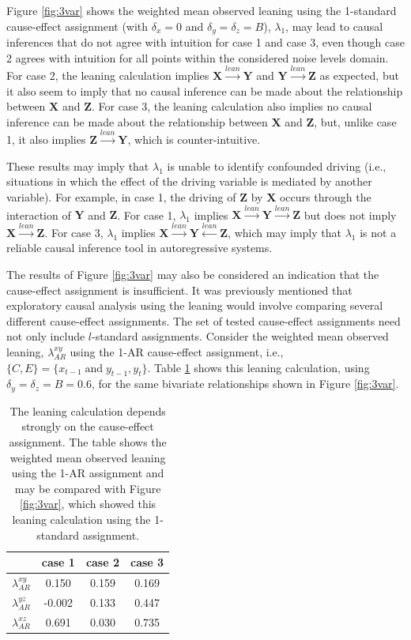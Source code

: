 \documentclass[twocolumn,aps,pre,groupedaddress]{revtex4-1}
\begin{document}
Figure \ref{fig:3var} shows the weighted mean observed leaning using the 1-standard cause-effect assignment (with $\delta_x = 0$ and $\delta_y = \delta_z = B$), $\lambda_1$, may lead to causal inferences that do not agree with intuition for case 1 and case 3, even though case 2 agrees with intuition for all points within the considered noise levels domain.  For case 2, the leaning calculation implies $\mathbf{X}\xrightarrow{lean}\mathbf{Y}$ and $\mathbf{Y}\xrightarrow{lean}\mathbf{Z}$ as expected, but it also seem to imply that no causal inference can be made about the relationship between $\mathbf{X}$ and $\mathbf{Z}$.  For case 3, the leaning calculation also implies no causal inference can be made about the relationship between $\mathbf{X}$ and $\mathbf{Z}$, but, unlike case 1, it also implies $\mathbf{Z}\xrightarrow{lean}\mathbf{Y}$, which is counter-intuitive.

These results may imply that $\lambda_1$ is unable to identify confounded driving (i.e., situations in which the effect of the driving variable is mediated by another variable).  For example, in case 1, the driving of $\mathbf{Z}$ by $\mathbf{X}$ occurs through the interaction of $\mathbf{Y}$ and $\mathbf{Z}$.  For case 1, $\lambda_1$ implies $\mathbf{X}\xrightarrow{lean}\mathbf{Y}\xrightarrow{lean}\mathbf{Z}$ but does not imply $\mathbf{X}\xrightarrow{lean}\mathbf{Z}$.  For case 3, $\lambda_1$ implies $\mathbf{X}\xrightarrow{lean}\mathbf{Y}\xleftarrow{lean}\mathbf{Z}$, which may imply that $\lambda_1$ is not a reliable causal inference tool in autoregressive systems.

The results of Figure \ref{fig:3var} may also be considered an indication that the cause-effect assignment is insufficient.  It was previously mentioned that exploratory causal analysis using the leaning would involve comparing several different cause-effect assignments.  The set of tested cause-effect assignments need not only include $l$-standard assignments.  Consider the weighted mean observed leaning, $\lambda_{AR}^{xy}$ using the 1-AR cause-effect assignment, i.e., $\{C,E\} = \{x_{t-1}\;\mathrm{ and }\;y_{t-1},y_t\}$.  Table \ref{tab:3var} shows this leaning calculation, using $\delta_y=\delta_z=B=0.6$, for the same bivariate relationships shown in Figure \ref{fig:3var}.
\begin{table}
\begin{tabular}{lccc}
 & case 1 & case 2 & case 3\\
 \hline
 $\lambda_{AR}^{xy}$ & 0.150 & 0.159 & 0.169\\
 $\lambda_{AR}^{yz}$ & -0.002 & 0.133 & 0.447\\
 $\lambda_{AR}^{xz}$ & 0.691 & 0.030 & 0.735\\
\end{tabular}
\caption{The leaning calculation depends strongly on the cause-effect assignment.  The table shows the weighted mean observed leaning using the 1-AR assignment and may be compared with Figure \ref{fig:3var}, which showed this leaning calculation using the 1-standard assignment.}
\label{tab:3var}
\end{table}
\end{document}
